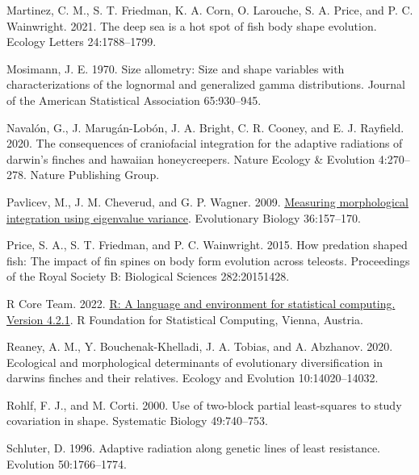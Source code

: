 \documentclass[
  11pt,
]{article}
\newlength{\cslhangindent}
\newlength{\cslentryspacingunit} %
\newenvironment{CSLReferences}[2] %
 {%
  \setlength{\parindent}{0pt}
  \ifodd #1
  \let\oldpar\par
  \def\par{\hangindent=\cslhangindent\oldpar}
  \fi
  \setlength{\parskip}{#2\cslentryspacingunit}
 }%
 {}
\begin{document}
\begin{CSLReferences}{1}{0}
\leavevmode{}%
Martinez, C. M., S. T. Friedman, K. A. Corn, O. Larouche, S. A. Price,
and P. C. Wainwright. 2021. The deep sea is a hot spot of fish body
shape evolution. Ecology Letters 24:1788--1799.

\leavevmode{}%
Mosimann, J. E. 1970. Size allometry: Size and shape variables with
characterizations of the lognormal and generalized gamma distributions.
Journal of the American Statistical Association 65:930--945.

\leavevmode{}%
Navalón, G., J. Marugán-Lobón, J. A. Bright, C. R. Cooney, and E. J.
Rayfield. 2020. The consequences of craniofacial integration for the
adaptive radiations of darwin's finches and hawaiian honeycreepers.
Nature Ecology \& Evolution 4:270--278. Nature Publishing Group.

\leavevmode{}%
Pavlicev, M., J. M. Cheverud, and G. P. Wagner. 2009.
\href{https://doi.org/10.1007/s11692-008-9042-7}{Measuring morphological
integration using eigenvalue variance}. Evolutionary Biology
36:157--170.

\leavevmode{}%
Price, S. A., S. T. Friedman, and P. C. Wainwright. 2015. How predation
shaped fish: The impact of fin spines on body form evolution across
teleosts. Proceedings of the Royal Society B: Biological Sciences
282:20151428.

\leavevmode{}%
R Core Team. 2022. \href{https://www.R-project.org/}{R: A language and
environment for statistical computing. Version 4.2.1}. R Foundation for
Statistical Computing, Vienna, Austria.

\leavevmode{}%
Reaney, A. M., Y. Bouchenak-Khelladi, J. A. Tobias, and A. Abzhanov.
2020. Ecological and morphological determinants of evolutionary
diversification in darwin{\textquotesingle}s finches and their
relatives. Ecology and Evolution 10:14020--14032.

\leavevmode{}%
Rohlf, F. J., and M. Corti. 2000. Use of two-block partial least-squares
to study covariation in shape. Systematic Biology 49:740--753.

\leavevmode{}%
Schluter, D. 1996. Adaptive radiation along genetic lines of least
resistance. Evolution 50:1766--1774.


\end{CSLReferences}
\end{document}
